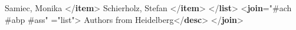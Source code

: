 \begin{shaded}
Samiec, Monika {</\textbf{item}>}\mbox{}\newline 
{}Schierholz, Stefan {</\textbf{item}>}\mbox{}\newline 
{</\textbf{list}>}\mbox{}\newline 
{<\textbf{join}\hspace*{1em}{target}="{\#a\textunderscore ch \#a\textunderscore bp \#a\textunderscore ss}"\mbox{}\newline 
\hspace*{1em}{result}="{list}">}\mbox{}\newline 
{}Authors from Heidelberg{</\textbf{desc}>}\mbox{}\newline 
{</\textbf{join}>}\end{shaded}\egroup\par \par
